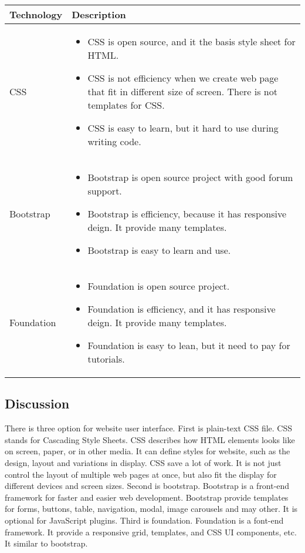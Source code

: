 \begin{center}
    \begin{tabular}{ | l | p{10cm} |}
    \hline
    Technology & Description  \\ \hline
    CSS \cite{CSS_intro}&
    \begin{itemize}
      \item CSS is open source, and it the basis style sheet for HTML.
      \item CSS is not efficiency when we create web page that fit in different size of screen. There is not templates for CSS.
      \item CSS is easy to learn, but it hard to use during writing code.
    \end{itemize}\\ \hline
    Bootstrap \cite{boot_intro}&
    \begin{itemize}
      \item Bootstrap is open source project with good forum support.
      \item Bootstrap is efficiency, because it has responsive deign. It provide many templates.
      \item Bootstrap is easy to learn and use.
    \end{itemize}\\ \hline
    Foundation \cite{foundation_intro}&
    \begin{itemize}
      \item Foundation is open source project.
      \item Foundation is efficiency, and it has responsive deign. It provide many templates.
      \item Foundation is easy to lean, but it need to pay for tutorials.
    \end{itemize}\\ \hline
    \end{tabular}
\end{center}

\subsection{Discussion}

There is three option for website user interface.
First is plain-text CSS file. CSS stands for Cascading Style Sheets. CSS describes how HTML elements looks like on screen, paper, or in other media. It can define styles for website, such as the design, layout and variations in display. CSS save a lot of work. It is not just control the layout of multiple web pages at once, but also fit the display for different devices and screen sizes.\cite{CSS_intro}
Second is bootstrap. Bootstrap is a front-end framework for faster and easier web development. Bootstrap provide templates for forms, buttons, table, navigation, modal, image carousels and may other. It is optional for JavaScript plugins. \cite{boot_intro}
Third is foundation. Foundation is a font-end framework. It provide a responsive grid, templates, and CSS UI components, etc. It similar to bootstrap. \cite{foundation_intro}

